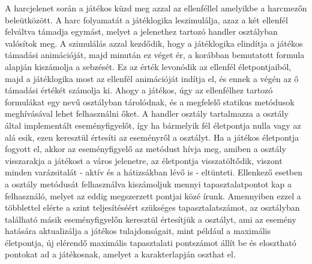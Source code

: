 A harcjelenet során a játékos küzd meg azzal az ellenféllel amelyikbe a harcmezőn beleütközött. 
A harc folyamatát a játéklogika leszimulálja, azaz a két ellenfél felváltva támadja egymást, melyet a jelenethez tartozó handler osztályban valósítok meg. 
A szimulálás azzal kezdődik, hogy a játéklogika elindítja a játékos támadási animációját, majd minután ez véget ér, a korábban bemutatott formula alapján kiszámolja a sebzését. 
Ez az érték levonódik az ellenfél életpontjaiból, majd a játéklogika most az ellenfél animációját indítja el, és ennek a végén az ő támadási értékét számolja ki. 
Ahogy a játékos, úgy az ellenfélhez tartozó formulákat egy  nevű osztályban tárolódnak, és a megfelelő statikus metódusok meghívásával lehet felhasználni őket. 
A handler osztály tartalmazza a  osztály által implementált eseményfigyelőt, így ha bármelyik fél életpontja nulla vagy az alá esik, ezen keresztül értesíti az eseményről a  osztályt. 
Ha a játékos életpontja fogyott el, akkor az eseményfigyelő az  metódust hívja meg, amiben a  osztály visszarakja a játékost a város jelenetre, az életpontja visszatöltődik, viszont minden varázsitalát - aktív és a hátizsákban lévő is - eltünteti. 
Ellenkező esetben a  osztály metódusát felhasználva kiszámoljuk mennyi tapasztalatpontot kap a felhasználó, melyet az eddig megszerzett pontjai közé írunk. 
Amennyiben ezzel a többlettel elérte a szint teljesítéséért szükséges tapasztalatszámot, az osztályban található másik eseményfigyelőn keresztül értesítjük a  osztályt, ami az esemény hatására aktualizálja a játékos tulajdonságait, mint például a maximális életpontja, új elérendő maximális tapasztalati pontszámot állít be és elosztható pontokat ad a játékosnak, amelyet a karakterlapján oszthat el. 









